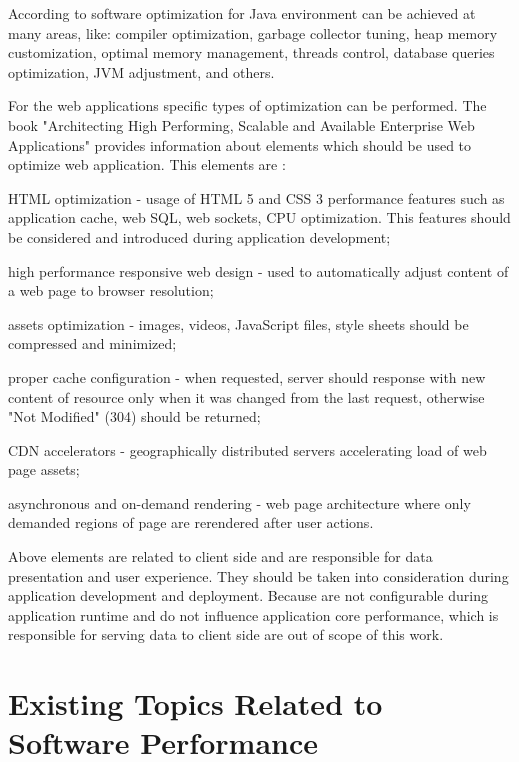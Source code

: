 \documentclass[10pt,a4paper]{article}
\let\tempone\itemize
\let\temptwo\enditemize
\renewenvironment{itemize}{\tempone\addtolength{\itemsep}{-0.4\baselineskip}}{\temptwo}
\begin{document}
According to  \cite{javaperformance} software optimization for Java environment can be achieved at many areas, like: compiler optimization, garbage collector tuning, heap memory customization, optimal memory management, threads control, database queries optimization, JVM adjustment, and others.

For the web applications specific types of optimization can be performed.  
The book "Architecting High Performing, Scalable and Available Enterprise Web Applications"  provides information about elements which should be used to optimize web application. This elements are \cite{architectingperformance}:
\begin{itemize}
 \item HTML optimization - usage of HTML 5 and CSS 3 performance features such as application cache, web SQL, web sockets, CPU optimization. This features should be considered and introduced during application development; 
 \item high performance responsive web design - used to automatically adjust content of a web page to browser resolution; 
 \item assets optimization - images, videos, JavaScript files, style sheets should be compressed and minimized; 
 \item proper cache configuration - when requested, server should response with new content of resource only when it was changed from the last request, otherwise "Not Modified" (304) should be returned;
 \item CDN accelerators - geographically distributed servers accelerating  load of web page assets; 
 \item asynchronous and on-demand rendering - web page architecture where only demanded regions of page are rerendered after user actions.  
\end{itemize}

Above elements are related to client side and are responsible for data presentation and user experience. They should be taken into consideration during application development and deployment. Because are not configurable during application runtime and do not influence application core performance, which is responsible for serving data to client side are out of scope of this work. 

\section{Existing Topics Related to Software Performance}
\end{document}
